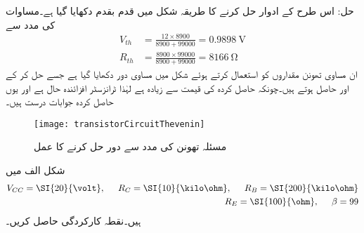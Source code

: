 حل:	اس طرح کے ادوار حل کرنے کا طریقہ شکل  میں قدم بقدم دکھایا گیا ہے۔مساوات   کی مدد سے
\begin{align*}
V_{th}&=\frac{12 \times 8900}{8900+99000}=\SI{0.9898}{\volt} \\
R_{th} &=\frac{8900 \times 99000}{8900+99000}=\SI{8166}{\ohm}
\end{align*}
ان مساوی تھونن مقداروں کو استعمال کرتے ہوئے شکل   میں مساوی دور دکھایا گیا ہے جسے حل کر کے   اور  حاصل ہوتے ہیں۔چونکہ حاصل کردہ  کی قیمت  سے زیادہ ہے لہٰذا ٹرانزسٹر افزائندہ حال ہے اور یوں حاصل کردہ جوابات درست ہیں۔
\begin{figure}
\centering
\texttt{[image: transistorCircuitThevenin]}
\caption{مسئلہ تھونن کی مدد سے دور حل کرنے کا عمل}
\label{شکل_مسئلہ_تھونن_سے_حل}
\end{figure}
شکل  الف میں 
\begin{align*}
V_{CC}=\SI{20}{\volt}, \hspace{5mm} R_C=\SI{10}{\kilo \ohm}, \hspace{5mm} R_B=\SI{200}{\kilo \ohm}\\
R_E=\SI{100}{\ohm}, \hspace{5mm} \beta=99
\end{align*}
ہیں۔نقطہ کارکردگی حاصل کریں۔

